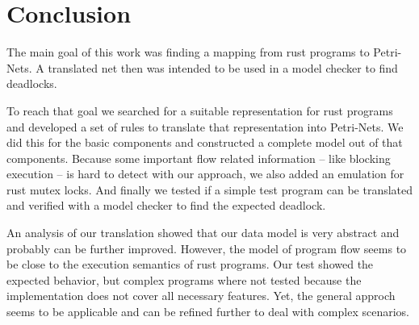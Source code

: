 \chapter{Conclusion}
\label{conclusion}
The main goal of this work was finding a mapping from rust programs to Petri-Nets.
A translated net then was intended to be used in a model checker to find deadlocks.

To reach that goal we searched for a suitable representation for rust programs and developed a set of rules to translate that representation into Petri-Nets.
We did this for the basic components and constructed a complete model out of that components.
Because some important flow related information -- like blocking execution -- is hard to detect with our approach, we also added an emulation for rust mutex locks.
And finally we tested if a simple test program can be translated and verified with a model checker to find the expected deadlock.

An analysis of our translation showed that our data model is very abstract and probably can be further improved.
However, the model of program flow seems to be close to the execution semantics of rust programs.
Our test showed the expected behavior, but complex programs where not tested because the implementation does not cover all necessary features.
Yet, the general approch seems to be applicable and can be refined further to deal with complex scenarios.
